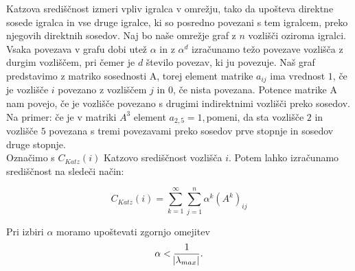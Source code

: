 \documentclass[a4paper]{article}
\begin{document}
Katzova središčnost izmeri vpliv igralca v omrežju, tako da upošteva direktne sosede igralca in vse druge igralce, ki so posredno povezani s tem igralcem, preko njegovih direktnih sosedov. Naj bo naše omrežje graf z $n$ vozlišči oziroma igralci. Vsaka povezava v grafu dobi utež $\alpha$ in z $\alpha^{d}$ izračunamo težo povezave vozlišča z durgim vozliščem, pri čemer je $d$ število povezav, ki ju povezuje. Naš graf predstavimo z matriko sosednosti A, torej element matrike $a_{ij}$ ima vrednost $1$, če je vozlišče $i$ povezano z vozliščem $j$ in $0$, če nista povezana. Potence matrike A nam povejo, če je vozlišče povezano s drugimi indirektnimi vozlišči preko sosedov. Na primer: če je v matriki $A^{3}$ element $a_{2,5}  = 1,$pomeni, da sta vozlišče $2$ in vozlišče $5$ povezana s tremi povezavami preko sosedov prve stopnje in sosedov druge stopnje. \\
Označimo s $C_{Katz}(i)$ Katzovo središčnost vozlišča $i$. Potem lahko izračunamo središčnost na sledeči način:

$$C_{Katz}(i) = \sum_{k=1}^{\infty}\sum_{j=1}^{n}\alpha^{k}(A^{k})_{ij}$$

Pri izbiri $\alpha$ moramo upoštevati zgornjo omejitev $$\alpha < \frac{1}{\abs{\lambda_{max}}}.$$
\end{document}
